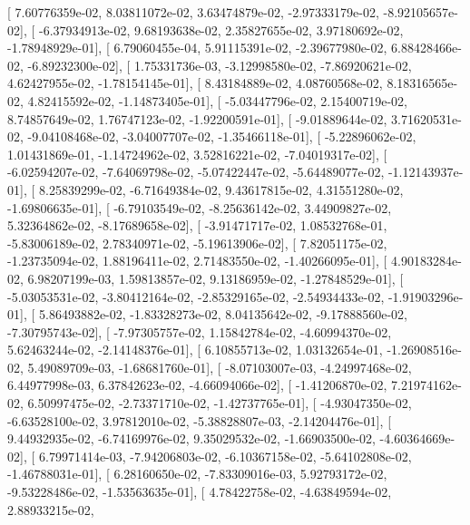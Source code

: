 \documentclass{article}
\begin{document}
       [  7.60776359e-02,   8.03811072e-02,   3.63474879e-02,
         -2.97333179e-02,  -8.92105657e-02],
       [ -6.37934913e-02,   9.68193638e-02,   2.35827655e-02,
          3.97180692e-02,  -1.78948929e-01],
       [  6.79060455e-04,   5.91115391e-02,  -2.39677980e-02,
          6.88428466e-02,  -6.89232300e-02],
       [  1.75331736e-03,  -3.12998580e-02,  -7.86920621e-02,
          4.62427955e-02,  -1.78154145e-01],
       [  8.43184889e-02,   4.08760568e-02,   8.18316565e-02,
          4.82415592e-02,  -1.14873405e-01],
       [ -5.03447796e-02,   2.15400719e-02,   8.74857649e-02,
          1.76747123e-02,  -1.92200591e-01],
       [ -9.01889644e-02,   3.71620531e-02,  -9.04108468e-02,
         -3.04007707e-02,  -1.35466118e-01],
       [ -5.22896062e-02,   1.01431869e-01,  -1.14724962e-02,
          3.52816221e-02,  -7.04019317e-02],
       [ -6.02594207e-02,  -7.64069798e-02,  -5.07422447e-02,
         -5.64489077e-02,  -1.12143937e-01],
       [  8.25839299e-02,  -6.71649384e-02,   9.43617815e-02,
          4.31551280e-02,  -1.69806635e-01],
       [ -6.79103549e-02,  -8.25636142e-02,   3.44909827e-02,
          5.32364862e-02,  -8.17689658e-02],
       [ -3.91471717e-02,   1.08532768e-01,  -5.83006189e-02,
          2.78340971e-02,  -5.19613906e-02],
       [  7.82051175e-02,  -1.23735094e-02,   1.88196411e-02,
          2.71483550e-02,  -1.40266095e-01],
       [  4.90183284e-02,   6.98207199e-03,   1.59813857e-02,
          9.13186959e-02,  -1.27848529e-01],
       [ -5.03053531e-02,  -3.80412164e-02,  -2.85329165e-02,
         -2.54934433e-02,  -1.91903296e-01],
       [  5.86493882e-02,  -1.83328273e-02,   8.04135642e-02,
         -9.17888560e-02,  -7.30795743e-02],
       [ -7.97305757e-02,   1.15842784e-02,  -4.60994370e-02,
          5.62463244e-02,  -2.14148376e-01],
       [  6.10855713e-02,   1.03132654e-01,  -1.26908516e-02,
          5.49089709e-03,  -1.68681760e-01],
       [ -8.07103007e-03,  -4.24997468e-02,   6.44977998e-03,
          6.37842623e-02,  -4.66094066e-02],
       [ -1.41206870e-02,   7.21974162e-02,   6.50997475e-02,
         -2.73371710e-02,  -1.42737765e-01],
       [ -4.93047350e-02,  -6.63528100e-02,   3.97812010e-02,
         -5.38828807e-03,  -2.14204476e-01],
       [  9.44932935e-02,  -6.74169976e-02,   9.35029532e-02,
         -1.66903500e-02,  -4.60364669e-02],
       [  6.79971414e-03,  -7.94206803e-02,  -6.10367158e-02,
         -5.64102808e-02,  -1.46788031e-01],
       [  6.28160650e-02,  -7.83309016e-03,   5.92793172e-02,
         -9.53228486e-02,  -1.53563635e-01],
       [  4.78422758e-02,  -4.63849594e-02,   2.88933215e-02,
\end{document}
